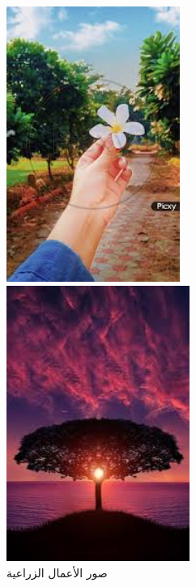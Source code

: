 \documentclass{article}
\begin{document}
\begin{figure}[H]
    \begin{minipage}{0.45\textwidth}
        \centering
        \includegraphics[height=9cm,width=\textwidth]{garden/3.jpg}
    \end{minipage}
    \hfill
    \begin{minipage}{0.45\textwidth}
        \centering
        \includegraphics[height=9cm,width=\textwidth]{garden/4.jpg}
    \end{minipage}
        \caption{صور الأعمال الزراعية}
\end{figure}
\end{document}
